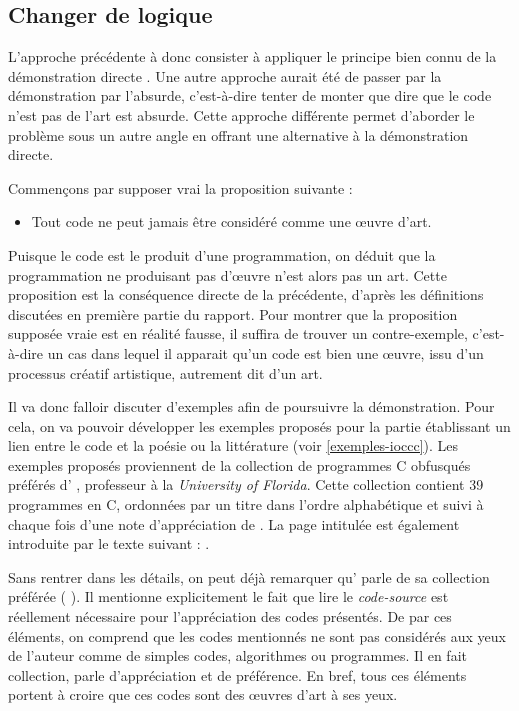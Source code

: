 \documentclass[12pt]{article} %
\begin{document}
\subsection{Changer de logique}
L'approche précédente à donc consister à appliquer le principe bien connu de la démonstration directe \cite{MDidier-Renforcement}. Une autre approche aurait été de passer par la démonstration par l'absurde, c'est-à-dire tenter de monter que dire que le code n'est pas de l'art est absurde. Cette approche différente permet d'aborder le problème sous un autre angle en offrant une alternative à la démonstration directe. 

Commençons par supposer vrai la proposition suivante :
\begin{itemize}
    \item Tout code ne peut jamais être considéré comme une œuvre d'art. 
\end{itemize}
Puisque le code est le produit d'une programmation, on déduit que la programmation ne produisant pas d'œuvre n'est alors pas un art. Cette proposition est la conséquence directe de la précédente, d'après les définitions discutées en première partie du rapport. Pour montrer que la proposition supposée vraie est en réalité fausse, il suffira de trouver un contre-exemple, c'est-à-dire un cas dans lequel il apparait qu'un code est bien une œuvre, issu d'un processus créatif artistique, autrement dit d'un art.

Il va donc falloir discuter d'exemples afin de poursuivre la démonstration. Pour cela, on va pouvoir développer les exemples proposés pour la partie établissant un lien entre le code et la poésie ou la littérature (voir \ref{exemples-ioccc}). Les exemples proposés proviennent de la collection de programmes C obfusqués préférés d'\citeauthor{MEnriqueBermudez-bio} \cite{MEnriqueBermudez-bio}, professeur à la \textit{University of Florida}. Cette collection contient 39 programmes en C, ordonnées par un titre dans l'ordre alphabétique et suivi à chaque fois d'une note d'appréciation de \citeauthor{MEnriqueBermudez-bio}. La page intitulée  est également introduite par le texte suivant :  \cite{MEnriqueBermudez-ObfuscatedCCode}.

Sans rentrer dans les détails, on peut déjà remarquer qu'\citeauthor{MEnriqueBermudez-bio} parle de sa collection préférée ( \cite{MEnriqueBermudez-bio}). Il mentionne explicitement le fait que lire le \textit{code-source} est réellement nécessaire pour l'appréciation des codes présentés. De par ces éléments, on comprend que les codes mentionnés ne sont pas considérés aux yeux de l'auteur comme de simples codes, algorithmes ou programmes. Il en fait collection, parle d'appréciation et de préférence. En bref, tous ces éléments portent à croire que ces codes sont des œuvres d'art à ses yeux.
\end{document}
